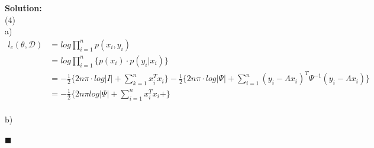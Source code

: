 \documentclass{article}
\newenvironment{solution}                               %
{\textbf{Solution:} \\}{$\blacksquare$\newline}         %
\begin{document}
\begin{solution}
        (4) \\
        a)
        \begin{align*}
            l_c(\theta, \mathcal{D}) &= log \prod_{i=1}^{n}{p(x_i, y_i)} \\
            &= log \prod_{i=1}^{n} \{p(x_i) \cdot p(y_i|x_i)\} \\
            &= -\frac{1}{2}\{2n\pi \cdot log|I| + \sum_{k=1}^{n} x_i^T x_i\}
               -\frac{1}{2}\{2n\pi \cdot log|\Psi| + \sum_{i=1}^{n}(y_i-\Lambda x_i)^T \Psi^{-1} (y_i-\Lambda x_i)\} \\
            &= -\frac{1}{2}\{2n\pi log|\Psi| + \sum_{i=1}^{n}{x_i^T x_i} + \}
        \end{align*} \\
        b) 

    \end{solution}
\end{document}
